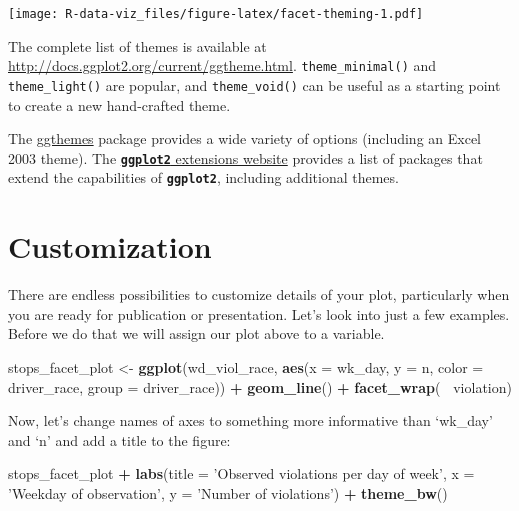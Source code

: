\documentclass[]{book}
\newenvironment{Shaded}{\begin{snugshade}}{\end{snugshade}}
\newcommand{\DataTypeTok}[1]{\textcolor[rgb]{0.13,0.29,0.53}{#1}}
\newcommand{\KeywordTok}[1]{\textcolor[rgb]{0.13,0.29,0.53}{\textbf{#1}}}
\newcommand{\NormalTok}[1]{#1}
\newcommand{\OperatorTok}[1]{\textcolor[rgb]{0.81,0.36,0.00}{\textbf{#1}}}
\newcommand{\StringTok}[1]{\textcolor[rgb]{0.31,0.60,0.02}{#1}}
\begin{document}
\texttt{[image: R-data-viz\_files/figure-latex/facet-theming-1.pdf]}

The complete list of themes is available
at \url{http://docs.ggplot2.org/current/ggtheme.html}. \texttt{theme\_minimal()} and \texttt{theme\_light()} are popular, and \texttt{theme\_void()} can be useful as a starting point to create a new hand-crafted theme.

The \href{https://cran.r-project.org/web/packages/ggthemes/vignettes/ggthemes.html}{ggthemes} package
provides a wide variety of options (including an Excel 2003 theme).
The \href{http://www.ggplot2-exts.org/gallery/}{\textbf{\texttt{ggplot2}} extensions website} provides a list
of packages that extend the capabilities of \textbf{\texttt{ggplot2}}, including additional themes.

\hypertarget{customization}{%
\section{Customization}\label{customization}}

There are endless possibilities to customize details of your plot, particularly when you are ready for publication or presentation. Let's look into just a few examples. Before we do that we will assign our plot above to a variable.

\begin{Shaded}
\begin{Highlighting}[]
\NormalTok{stops_facet_plot <-}\StringTok{ }\KeywordTok{ggplot}\NormalTok{(wd_viol_race, }\KeywordTok{aes}\NormalTok{(}\DataTypeTok{x =}\NormalTok{ wk_day, }\DataTypeTok{y =}\NormalTok{ n, }\DataTypeTok{color =}\NormalTok{ driver_race, }\DataTypeTok{group =}\NormalTok{ driver_race)) }\OperatorTok{+}
\StringTok{  }\KeywordTok{geom_line}\NormalTok{() }\OperatorTok{+}\StringTok{ }
\StringTok{  }\KeywordTok{facet_wrap}\NormalTok{(}\OperatorTok{~}\StringTok{ }\NormalTok{violation)}
\end{Highlighting}
\end{Shaded}

Now, let's change names of axes to something more informative than `wk\_day' and `n' and add a title to the figure:

\begin{Shaded}
\begin{Highlighting}[]
\NormalTok{stops_facet_plot }\OperatorTok{+}
\StringTok{  }\KeywordTok{labs}\NormalTok{(}\DataTypeTok{title =} \StringTok{'Observed violations per day of week'}\NormalTok{,}
         \DataTypeTok{x =} \StringTok{'Weekday of observation'}\NormalTok{,}
         \DataTypeTok{y =} \StringTok{'Number of violations'}\NormalTok{) }\OperatorTok{+}
\StringTok{  }\KeywordTok{theme_bw}\NormalTok{()}
\end{Highlighting}
\end{Shaded}
\end{document}
